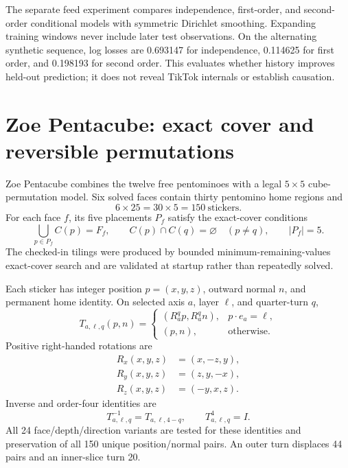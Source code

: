 The separate feed experiment compares independence, first-order, and second-order conditional models with symmetric Dirichlet smoothing. Expanding training windows never include later test observations. On the alternating synthetic sequence, log losses are 0.693147 for independence, 0.114625 for first order, and 0.198193 for second order. This evaluates whether history improves held-out prediction; it does not reveal TikTok internals or establish causation.

\section{Zoe Pentacube: exact cover and reversible permutations}
Zoe Pentacube combines the twelve free pentominoes with a legal $5\times5$ cube-permutation model. Six solved faces contain thirty pentomino home regions and
\begin{equation}
6\times25=30\times5=150\ \text{stickers}.
\end{equation}
For each face $f$, its five placements $P_f$ satisfy the exact-cover conditions
\begin{equation}
\bigcup_{p\in P_f}C(p)=F_f,\qquad
C(p)\cap C(q)=\varnothing\quad(p\neq q),\qquad |P_f|=5.
\end{equation}
The checked-in tilings were produced by bounded minimum-remaining-values exact-cover search and are validated at startup rather than repeatedly solved.

Each sticker has integer position $p=(x,y,z)$, outward normal $n$, and permanent home identity. On selected axis $a$, layer $\ell$, and quarter-turn $q$,
\begin{equation}
T_{a,\ell,q}(p,n)=
\begin{cases}
(R_a^qp,R_a^qn),&p\cdot e_a=\ell,\\
(p,n),&\text{otherwise}.
\end{cases}
\end{equation}
Positive right-handed rotations are
\begin{align}
R_x(x,y,z)&=(x,-z,y),\\
R_y(x,y,z)&=(z,y,-x),\\
R_z(x,y,z)&=(-y,x,z).
\end{align}
Inverse and order-four identities are
\begin{equation}
T_{a,\ell,q}^{-1}=T_{a,\ell,4-q},\qquad T_{a,\ell,q}^{4}=I.
\end{equation}
All 24 face/depth/direction variants are tested for these identities and preservation of all 150 unique position/normal pairs. An outer turn displaces 44 pairs and an inner-slice turn 20.

